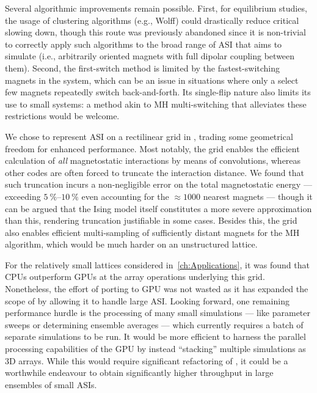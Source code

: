 Several algorithmic improvements remain possible.
First, for equilibrium studies, the usage of clustering algorithms (e.g., Wolff) could drastically reduce critical slowing down, though this route was previously abandoned since it is non-trivial to correctly apply such algorithms to the broad range of ASI that \hotspice aims to simulate (i.e., arbitrarily oriented magnets with full dipolar coupling between them).
Second, the first-switch method is limited by the fastest-switching magnets in the system, which can be an issue in situations where only a select few magnets repeatedly switch back-and-forth.
Its single-flip nature also limits its use to small systems: a method akin to MH multi-switching that alleviates these restrictions would be welcome. \par
We chose to represent ASI on a rectilinear grid in \hotspice, trading some geometrical freedom for enhanced performance. %
Most notably, the grid enables the efficient calculation of \textit{all} magnetostatic interactions by means of convolutions, whereas other codes are often forced to truncate the interaction distance.
We found that such truncation incurs a non-negligible error on the total magnetostatic energy --- exceeding $\SIrange{5}{10}{\percent}$ even accounting for the $\approx 1000$ nearest magnets --- though it can be argued that the Ising model itself constitutes a more severe approximation than this, rendering truncation justifiable in some cases.
Besides this, the grid also enables efficient multi-sampling of sufficiently distant magnets for the MH algorithm, which would be much harder on an unstructured lattice. \par
For the relatively small lattices considered in~\cref{ch:Applications}, it was found that CPUs outperform GPUs at the array operations underlying this grid. %
Nonetheless, the effort of porting \hotspice to GPU was not wasted as it has expanded the scope of \hotspice by allowing it to handle large ASI.
Looking forward, one remaining performance hurdle is the processing of many small simulations --- like parameter sweeps or determining ensemble averages --- which currently requires a batch of separate simulations to be run.
It would be more efficient to harness the parallel processing capabilities of the GPU by instead ``stacking'' multiple simulations as 3D arrays.
While this would require significant refactoring of \hotspice, it could be a worthwhile endeavour to obtain significantly higher throughput in large ensembles of small ASIs.

